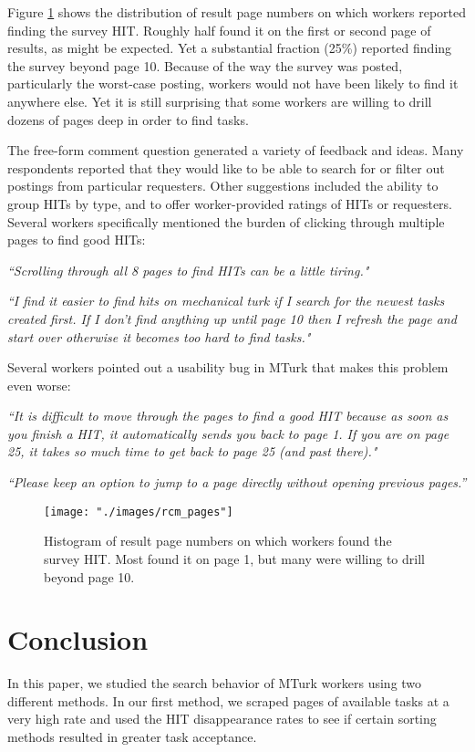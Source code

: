 \documentclass{sig-alternate}
\begin{document}
Figure \ref{fig:X4} shows the distribution of result page numbers on which workers reported finding the survey HIT.  Roughly half found it on the first or second page of results, as might be expected.  Yet a substantial fraction (25\%) reported finding the survey beyond page 10.  Because of the
way the survey was posted, particularly the worst-case posting, workers would not have been likely to find it anywhere else.  Yet it is still surprising that
some workers are willing to drill dozens of pages deep in order to find tasks.

The free-form comment question generated a variety of feedback and ideas.  Many respondents reported that they would like to be able to search for or filter out postings from particular requesters.  Other suggestions included the ability to group HITs by type, and to offer worker-provided ratings of HITs or requesters.  Several workers specifically mentioned the burden of clicking through multiple pages to find good HITs:

{\em ``Scrolling through all 8 pages to find HITs can be a little tiring."}

{\em ``I find it easier to find hits on mechanical turk if I search for the newest tasks created first. If I don't find anything up until page 10 then I refresh the page and start over otherwise it becomes too hard to find tasks."}

Several workers pointed out a usability bug in MTurk that makes this problem even worse:

{\em ``It is difficult to move through the pages to find a good HIT because as soon as you finish a HIT, it automatically sends you back to page 1. If you are on page 25, it takes so much time to get back to page 25 (and past there)."}

{\em ``Please keep an option to jump to a page directly without opening previous pages.'' }

\begin{figure}[htp]
\centering
\texttt{[image: "./images/rcm\_pages"]}
\caption{Histogram of result page numbers on which workers found
the survey HIT.  Most found it on page 1, but many were willing to drill 
beyond page 10.
}
\label{fig:X4}
\end{figure}

\section{Conclusion}
In this paper, we studied the search behavior of MTurk workers
using two different methods.  In our first method, we scraped pages of available tasks at a very high rate and used the HIT disappearance rates
to see if certain sorting methods resulted in greater task acceptance.  
\end{document}
